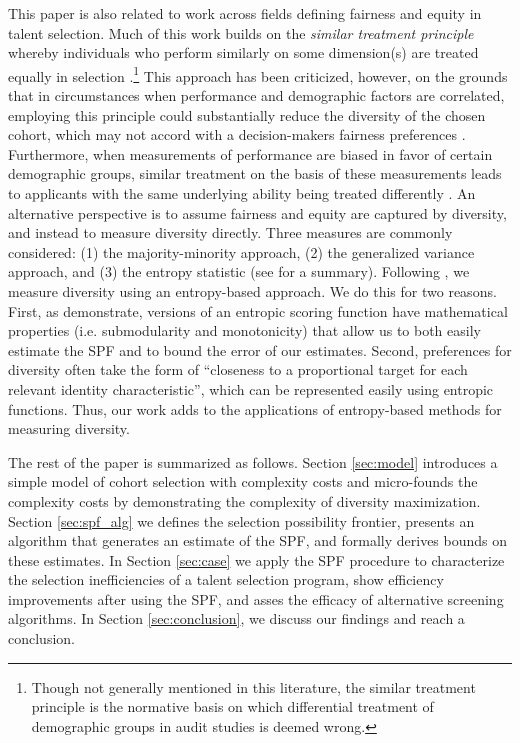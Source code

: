 This paper is also related to work across fields defining fairness and equity in talent selection. Much of this work builds on the \emph{similar treatment principle} whereby individuals who perform similarly on some dimension(s) are treated equally in selection \cite{dwork2012fairness}.\footnote{Though not generally mentioned in this literature, the similar treatment principle is the normative basis on which differential treatment of demographic groups in audit studies is deemed wrong.} This approach has been criticized, however, on the grounds that in circumstances when performance and demographic factors are correlated, employing this principle could substantially reduce the diversity of the chosen cohort, which may not accord with a decision-makers fairness preferences \cite{fleisher2021s}. Furthermore, when measurements of performance are biased in favor of certain demographic groups, similar treatment on the basis of these measurements leads to applicants with the same underlying ability being treated differently \cite{fleisher2021s}. An alternative perspective is to assume fairness and equity are captured by diversity, and instead to measure diversity directly. Three measures are commonly considered: (1) the majority-minority approach, (2) the generalized variance approach, and (3) the entropy statistic (see \textcite{budescu2012measure} for a summary). Following \textcite{huppenkothen2020entrofy}, we measure diversity using an entropy-based approach. We do this for two reasons. First, as \textcite{huppenkothen2020entrofy} demonstrate, versions of an entropic scoring function have mathematical properties (i.e. submodularity and monotonicity) that allow us to both easily estimate the SPF and to bound the error of our estimates. Second, preferences for diversity often take the form of ``closeness to a proportional target for each relevant identity characteristic'', which can be represented easily using entropic functions. Thus, our work adds to the applications of entropy-based methods for measuring diversity.

The rest of the paper is summarized as follows. Section \ref{sec:model} introduces a simple model of cohort selection with complexity costs and micro-founds the complexity costs by demonstrating the complexity of diversity maximization. Section \ref{sec:spf_alg} we defines the selection possibility frontier, presents an algorithm that generates an estimate of the SPF, and formally derives bounds on these estimates. In Section \ref{sec:case} we apply the SPF procedure to characterize the selection inefficiencies of a talent selection program, show efficiency improvements after using the SPF, and asses the efficacy of alternative screening algorithms. In Section \ref{sec:conclusion}, we discuss our findings and reach a conclusion. 


